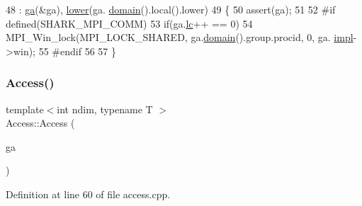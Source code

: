 \begin{DoxyCode}
48                                                    : \hyperlink{classshark_1_1ndim_1_1_access_abc59e261a07fcecc3f1db641ef04efa7}{ga}(&ga), \hyperlink{classshark_1_1ndim_1_1_access_ac1e92dba307ff877963c94bd42fcbafb}{lower}(ga.
      \hyperlink{classshark_1_1ndim_1_1_global_array_a435ee8ff23c3feadf2ef2be64d4f375c}{domain}().local().lower)
49 \{
50     assert(ga);
51 
52 \textcolor{preprocessor}{    #if defined(SHARK\_MPI\_COMM)}
53         \textcolor{keywordflow}{if}(ga.\hyperlink{classshark_1_1ndim_1_1_global_array_a8248f4bd6e1f48d25148dd6d5288cb4c}{lc}++ == 0)
54             MPI\_Win\_lock(MPI\_LOCK\_SHARED, ga.\hyperlink{classshark_1_1ndim_1_1_global_array_a435ee8ff23c3feadf2ef2be64d4f375c}{domain}().group.procid, 0, ga.
      \hyperlink{classshark_1_1ndim_1_1_global_array_a70684121da4badfef791c15d7076282f}{impl}->win);
55 \textcolor{preprocessor}{    #endif}
56 
57 \}
\end{DoxyCode}
\hypertarget{classshark_1_1ndim_1_1_access_a228d7e275cbb011b48e6d7cb76f8479d}{}\label{classshark_1_1ndim_1_1_access_a228d7e275cbb011b48e6d7cb76f8479d} 
\subsubsection{\texorpdfstring{Access()}{Access()}\hspace{0.1cm}{\footnotesize\ttfamily [2/5]}}
{\footnotesize\ttfamily template$<$int ndim, typename T $>$ \\
Access\+::\+Access (\begin{DoxyParamCaption}\item[{\hyperlink{classshark_1_1ndim_1_1_global_array}{Global\+Array}$<$ ndim, T $>$ \&}]{ga }\end{DoxyParamCaption})}



Definition at line 60 of file access.\+cpp.


